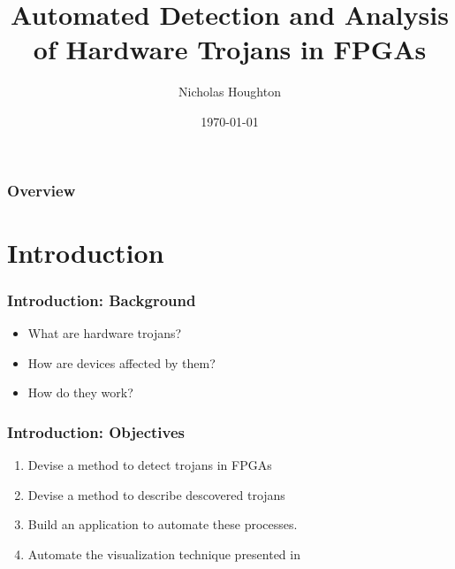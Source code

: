 \documentclass{beamer}
\title[FPGA Security]{Automated Detection and Analysis of Hardware Trojans in FPGAs} %
\author{Nicholas Houghton} %
\institute[UVIC] %
{
University of Victoria \\ %
\medskip
\textit{nhoughto@uvic.ca} %
}
\date{\today} %
\begin{document}
\begin{frame}
\titlepage %
\end{frame}

\begin{frame}
\frametitle{Overview} %
\tableofcontents %
\end{frame}


\section{Introduction}
\begin{frame}
	\frametitle{Introduction: Background}
	\begin{itemize}
		\item What are hardware trojans?
		\item How are devices affected by them?
		\item How do they work?
	\end{itemize}
\end{frame}

\begin{frame}
	\frametitle{Introduction: Objectives}
	\begin{enumerate}
		\item Devise a method to detect trojans in FPGAs
		\item Devise a method to describe descovered trojans
		\item Build an application to automate these processes.
		\item Automate the visualization technique presented in~\cite{samerAttribute}
	\end{enumerate}
\end{frame}
\end{document}

